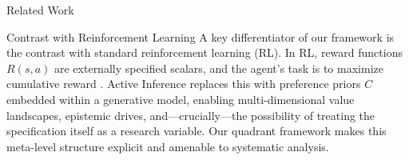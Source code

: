 \documentclass[
  ignorenonframetext,
]{beamer}
\begin{document}
\begin{frame}{Related Work}
\begin{block}{Contrast with Reinforcement Learning}
\protect{}\label{contrast-with-reinforcement-learning}
A key differentiator of our framework is the contrast with standard
reinforcement learning (RL). In RL, reward functions \(R(s,a)\) are
externally specified scalars, and the agent's task is to maximize
cumulative reward \cite{tschantz2020scaling}. Active Inference replaces
this with preference priors \(C\) embedded within a generative model,
enabling multi-dimensional value landscapes, epistemic drives,
and---crucially---the possibility of treating the specification itself
as a research variable. Our quadrant framework makes this meta-level
structure explicit and amenable to systematic analysis.
\end{block}
\end{frame}
\end{document}

